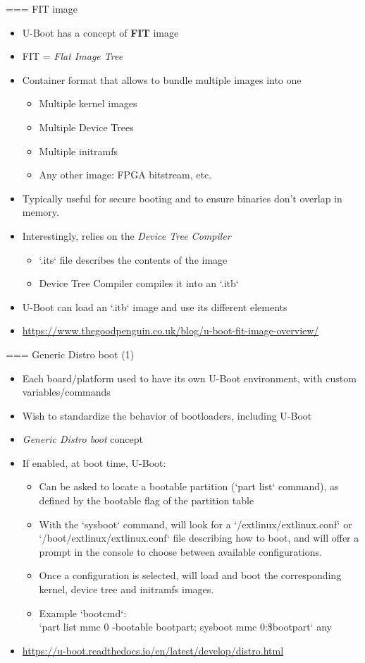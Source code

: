 === {FIT image}
  \begin{itemize}
  \item U-Boot has a concept of {\bf FIT} image
  \item FIT = {\em Flat Image Tree}
  \item Container format that allows to bundle multiple images into
    one
    \begin{itemize}
    \item Multiple kernel images
    \item Multiple Device Trees
    \item Multiple initramfs
    \item Any other image: FPGA bitstream, etc.
    \end{itemize}
  \item Typically useful for secure booting and to ensure binaries
	don't overlap in memory.
  \item Interestingly, relies on the {\em Device Tree Compiler}
    \begin{itemize}
    \item `.its` file describes the contents of the image
    \item Device Tree Compiler compiles it into an `.itb`
    \end{itemize}
  \item U-Boot can load an `.itb` image and use its different
    elements
  \item \url{https://www.thegoodpenguin.co.uk/blog/u-boot-fit-image-overview/}
  \end{itemize}


=== {Generic Distro boot (1)}
  \begin{itemize}
  \item Each board/platform used to have its own U-Boot environment,
    with custom variables/commands
  \item Wish to standardize the behavior of bootloaders, including
    U-Boot
  \item {\em Generic Distro boot} concept
  \item If enabled, at boot time, U-Boot:
    \begin{itemize}
    \item Can be asked to locate a bootable partition (`part list` command),
          as defined by the bootable flag of the partition table
    \item With the `sysboot` command, will look for a
          `/extlinux/extlinux.conf` or `/boot/extlinux/extlinux.conf`
	  file describing how to boot, and will offer a prompt in the console
          to choose between available configurations.
    \item Once a configuration is selected, will load and boot the
          corresponding kernel, device tree and initramfs images.
    \item Example `bootcmd`:\\
          `part list mmc 0 -bootable bootpart; sysboot mmc 0:\${bootpart` any}
    \end{itemize}
  \item \url{https://u-boot.readthedocs.io/en/latest/develop/distro.html}
  \end{itemize}


